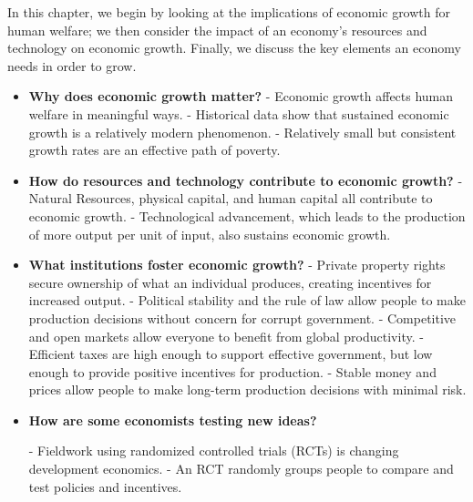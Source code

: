 \documentclass[11pt]{article} %
\begin{document}
In this chapter, we begin by looking at the implications of economic growth for human welfare; we then consider the impact of an economy's resources and technology on economic growth. Finally, we discuss the key elements an economy needs in order to grow.
\begin{tcolorbox}[width=\textwidth,colback={white},title={Big Questions},colbacktitle=yellow,coltitle=blue]
\begin{itemize}
\item \textbf{Why does economic growth matter?}
	\subitem - Economic growth affects human welfare in meaningful ways.
	\subitem - Historical data show that sustained economic growth is a relatively modern phenomenon.
	\subitem - Relatively small but consistent growth rates are an effective path of poverty.
	
\item \textbf{How do resources and technology contribute to economic growth?}
	\subitem - Natural Resources, physical capital, and human capital all contribute to economic growth.
	\subitem - Technological advancement, which leads to the production of more output per unit of input, also sustains economic growth.
	
\item \textbf{What institutions foster economic growth?}
	\subitem - Private property rights secure ownership of what an individual produces, creating incentives for increased output.
	\subitem - Political stability and the rule of law allow people to make production decisions without concern for corrupt government.
	\subitem - Competitive and open markets allow everyone to benefit from global productivity.
	\subitem - Efficient taxes are high enough to support effective government, but low enough to provide positive incentives for production.
	\subitem - Stable money and prices allow people to make long-term production decisions with minimal risk.
	
\item \textbf{How are some economists testing new ideas?}

	\subitem - Fieldwork using randomized controlled trials (RCTs) is changing development economics.
	\subitem - An RCT randomly groups people to compare and test policies and incentives.
	
\end{itemize}

\end{tcolorbox}

\newpage
\end{document}
